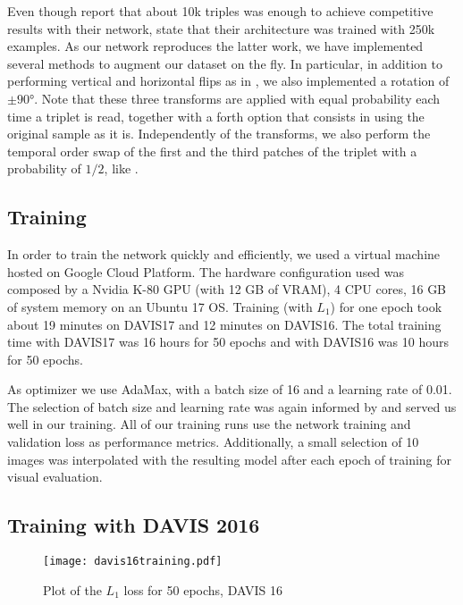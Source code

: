 \documentclass[10pt,twocolumn,letterpaper]{article}
\begin{document}
Even though \citeauthor{PhaseNet} report that about 10k triples was enough to achieve competitive results with their network, \citeauthor{SepConv} state that their architecture was trained with 250k examples. As our network reproduces the latter work, we have implemented several methods to augment our dataset on the fly. In particular, in addition to performing vertical and horizontal flips as in \cite{SepConv}, we also implemented a rotation of $\pm\ang{90}$. Note that these three transforms are applied with equal probability each time a triplet is read, together with a forth option that consists in using the original sample as it is. Independently of the transforms, we also perform the temporal order swap of the first and the third patches of the triplet with a probability of $1/2$, like \citeauthor{SepConv}.


\subsection{Training}
\label{sec:training}
In order to train the network quickly and efficiently, we used a virtual machine hosted on Google Cloud Platform. The hardware configuration used was composed by a Nvidia K-80 GPU (with 12 GB of VRAM), 4 CPU cores, 16 GB of system memory on an Ubuntu 17 OS. Training (with $L_1$) for one epoch took about 19 minutes on DAVIS17 and 12 minutes on DAVIS16. The total training time with DAVIS17 was 16 hours for 50 epochs and with DAVIS16 was 10 hours for 50 epochs.

As optimizer we use AdaMax, with a batch size of 16 and a learning rate of 0.01. The selection of batch size and learning rate was again informed by \citeauthor{SepConv} and served us well in our training. All of our training runs use the network training and validation loss as performance metrics. Additionally, a small selection of 10 images was interpolated with the resulting model after each epoch of training for visual evaluation.


\subsection{Training with DAVIS 2016}

\begin{figure}[t]
	\begin{center}
	\texttt{[image: davis16training.pdf]}
	\end{center}
	\caption{Plot of the $L_1$ loss for 50 epochs, DAVIS 16}
    \label{fig:davis16training}
\end{figure}
\end{document}
